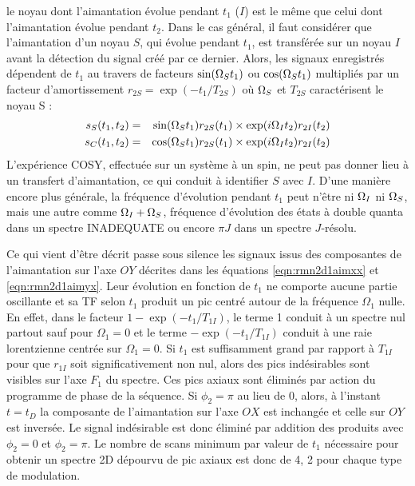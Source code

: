 le noyau dont l'aimantation évolue pendant $t_1$ ($I$) est le même que celui
dont l'aimantation évolue pendant $t_2$.
Dans le cas général, il faut considérer que l'aimantation d'un noyau $S$,
qui évolue pendant $t_1$, est transférée sur un noyau $I$ avant la détection
du signal créé par ce dernier.
Alors, les signaux enregistrés dépendent de $t_1$ au travers de facteurs
$\sin(\Omega_S t_1)$ ou $\cos(\Omega_S t_1)$ multipliés par un facteur d'amortissement
$r_{2S}=\exp(-t_1/T_{2S})$ où $\Omega_S$ et $T_{2S}$ caractérisent le noyau S :
\begin{eqnarray}
s_S(t_1, t_2) & = & \sin(\Omega_S t_1) r_{2S}(t_1) \times \exp(i \Omega_I t_2 ) r_{2I}(t_2) \\
s_C(t_1, t_2) & = & \cos(\Omega_S t_1) r_{2S}(t_1) \times \exp(i \Omega_I t_2 ) r_{2I}(t_2)
\end{eqnarray}
L'expérience COSY, effectuée sur un système à un spin, ne peut pas donner
lieu à un transfert d'aimantation, ce qui conduit à identifier $S$ avec $I$.
D'une manière encore plus générale, la fréquence d'évolution pendant $t_1$
peut n'être ni $\Omega_I$ ni $\Omega_S$, mais une autre comme $\Omega_I + \Omega_S$, fréquence
d'évolution des états à double quanta dans un spectre INADEQUATE
ou encore $\pi J$ dans un spectre $J$-résolu.

Ce qui vient d'être décrit passe sous silence les signaux issus des composantes de
l'aimantation sur l'axe $OY$ décrites dans les équations
\ref{eqn:rmn2d1aimxx} et \ref{eqn:rmn2d1aimyx}.
Leur évolution en fonction de $t_1$ ne comporte aucune partie oscillante et sa TF selon $t_1$
produit un pic centré autour de la fréquence $\Omega_1$ nulle.
En effet, dans le facteur $1-\exp(-t_1/T_{1I})$, le terme 1 conduit à un
spectre nul partout sauf
pour $\Omega_1 = 0$ et le terme $-\exp(-t_1/T_{1I})$ conduit à une raie lorentzienne
centrée sur $\Omega_1 = 0$.
Si $t_1$ est suffisamment grand par rapport à $T_{1I}$ pour que $r_{1I}$ soit
significativement non nul, alors des pics indésirables sont visibles sur l'axe 
$F_1$ du spectre.
Ces pics axiaux sont éliminés par action du programme de phase de la séquence.
Si $\phi_2 = \pi$ au lieu de $0$, alors, à l'instant $t=t_D$
la composante de l'aimantation sur l'axe $OX$ est inchangée et celle sur $OY$
est inversée. 
Le signal indésirable est donc éliminé par addition des {\FID} produits
avec $\phi_2 = 0$ et $\phi_2 = \pi$.
Le nombre de scans minimum par valeur de $t_1$ nécessaire pour obtenir un spectre 2D
dépourvu de pic axiaux est donc de 4, 2 pour chaque type de modulation.

